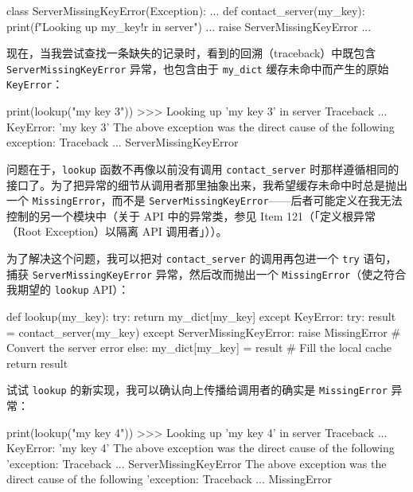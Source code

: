 \begin{codebox}[python]
class ServerMissingKeyError(Exception):
    ...
def contact_server(my_key):
    print(f"Looking up {my_key!r} in server")
    ...
    raise ServerMissingKeyError
    ...
\end{codebox}

现在，当我尝试查找一条缺失的记录时，看到的回溯（traceback）中既包含 \texttt{ServerMissingKeyError} 异常，也包含由于 \texttt{my\_dict} 缓存未命中而产生的原始 \texttt{KeyError}：

\begin{codebox}[python]
print(lookup("my key 3"))
>>>
Looking up 'my key 3' in server
Traceback ...
KeyError: 'my key 3'
The above exception was the direct cause of the following
exception:
Traceback ...
ServerMissingKeyError
\end{codebox}

问题在于，\texttt{lookup} 函数不再像以前没有调用 \texttt{contact\_server} 时那样遵循相同的接口了。为了把异常的细节从调用者那里抽象出来，我希望缓存未命中时总是抛出一个 \texttt{MissingError}，而不是 \texttt{ServerMissingKeyError}——后者可能定义在我无法控制的另一个模块中（关于 API 中的异常类，参见 Item 121（「定义根异常（Root Exception）以隔离 API 调用者」））。

为了解决这个问题，我可以把对 \texttt{contact\_server} 的调用再包进一个 \texttt{try} 语句，捕获 \texttt{ServerMissingKeyError} 异常，然后改而抛出一个 \texttt{MissingError}（使之符合我期望的 \texttt{lookup} API）：

\begin{codebox}[python]
def lookup(my_key):
    try:
        return my_dict[my_key]
    except KeyError:
        try:
            result = contact_server(my_key)
        except ServerMissingKeyError:
            raise MissingError       # Convert the server error
        else:
            my_dict[my_key] = result  # Fill the local cache
            return result
\end{codebox}

试试 \texttt{lookup} 的新实现，我可以确认向上传播给调用者的确实是 \texttt{MissingError} 异常：

\begin{codebox}[python]
print(lookup("my key 4"))
>>>
Looking up 'my key 4' in server
Traceback ...
KeyError: 'my key 4'
The above exception was the direct cause of the following
'exception:
Traceback ...
ServerMissingKeyError
The above exception was the direct cause of the following
'exception:
Traceback ...
MissingError
\end{codebox}

